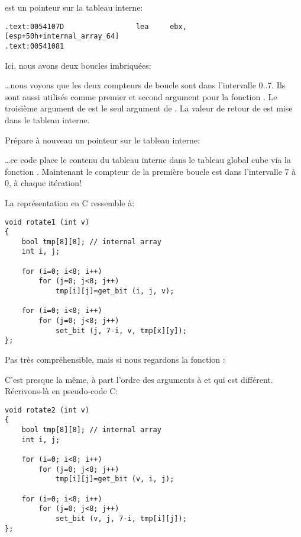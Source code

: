 \EBX est un pointeur sur la tableau interne:

\begin{lstlisting}[style=customasmx86]
.text:0054107D                 lea     ebx, [esp+50h+internal_array_64]
.text:00541081
\end{lstlisting}

Ici, nous avons deux boucles imbriquées:



\dots nous voyons que les deux compteurs de boucle sont dans l'intervalle 0..7.
Ils sont aussi utilisés comme premier et second argument pour la fonction .
Le troisième argument de  est le seul argument de .
La valeur de retour de  est mise dans le tableau interne.

Prépare à nouveau un pointeur sur le tableau interne:



\dots ce code place le contenu du tableau interne dans le tableau global cube via
la fonction .
Maintenant le compteur de la première boucle est dans l'intervalle 7 à 0, 
à chaque itération!

La représentation en C ressemble à:

\begin{lstlisting}[style=customc]
void rotate1 (int v)
{
	bool tmp[8][8]; // internal array
	int i, j;

	for (i=0; i<8; i++)
		for (j=0; j<8; j++)
			tmp[i][j]=get_bit (i, j, v);

	for (i=0; i<8; i++)
		for (j=0; j<8; j++)
			set_bit (j, 7-i, v, tmp[x][y]);
};
\end{lstlisting}

Pas très compréhensible, mais si nous regardons la fonction :



C'est presque la même, à part l'ordre des arguments à  et 
qui est différent.
Récrivons-là en pseudo-code C:

\begin{lstlisting}[style=customc]
void rotate2 (int v)
{
	bool tmp[8][8]; // internal array
	int i, j;

	for (i=0; i<8; i++)
		for (j=0; j<8; j++)
			tmp[i][j]=get_bit (v, i, j);

	for (i=0; i<8; i++)
		for (j=0; j<8; j++)
			set_bit (v, j, 7-i, tmp[i][j]);
};
\end{lstlisting}

